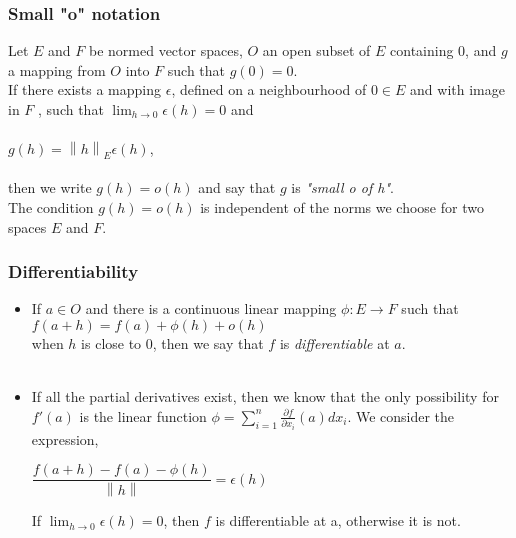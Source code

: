 \documentclass{beamer}
\newcommand\norm[1]{\left\lVert#1\right\rVert}
\begin{document}
\begin{frame}
\frametitle{Small "o" notation}
Let $E$ and $F$ be normed vector spaces, $O$ an open subset of $E$ containing 0, and $g$ a mapping from $O$ into $F$ such that $g(0) =  0$.\\ If there exists a mapping $\epsilon$, defined on a neighbourhood of $0 \in E$ and with image in $F$ , such that $\lim_{h \to 0} \epsilon(h) = 0$ and \\~\\
\hspace*{2cm} $g(h) = \norm{h}_E \epsilon(h)$,\\~\\
then we write $g(h) = o(h)$ and say that $g$ is \textit{"small o of h"}. \\

The condition $g(h) = o(h)$ is independent of the norms we choose for two spaces $E$ and $F$. \\

\end{frame}
\begin{frame}
\frametitle{Differentiability}
\begin{itemize}
\item If $a \in O$ and there is a continuous linear mapping $\phi : E \rightarrow F$ such that \\
\hspace*{1cm} $ f(a+h) = f(a) + \phi (h) + o(h) $ \\
when $h$ is close to 0, then we say that $f$ is \textit{differentiable} at $a$.\\~\\

\item If all the partial derivatives exist, then we know that the only possibility for $f'(a)$ is the linear function $ \phi = \sum_{i=1}^{n} \frac{\partial f}{\partial x_i} (a) dx_i $. We consider the expression,\\

\begin{center}

$ \dfrac{f(a+h) - f(a) - \phi (h)}{\norm{h}} = \epsilon (h)$
\end{center}

If $\lim_{h \to 0} \epsilon (h) =  0$, then $f$ is differentiable at a, otherwise it is not. \\

\end{itemize}
\end{frame}
\end{document}
